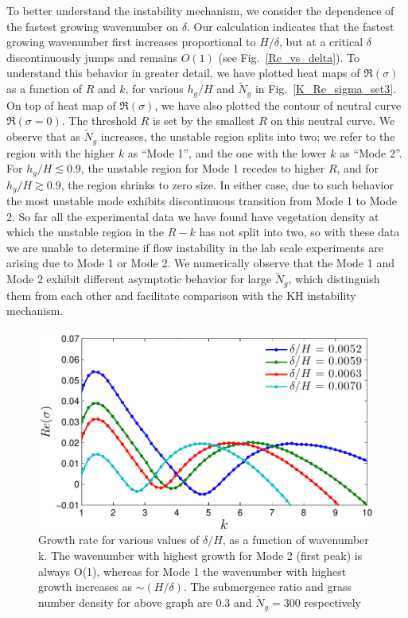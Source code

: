 \documentclass[12pt]{report}   %
\newcommand{\hg}{h_g}
\newcommand{\Rey}{{R}}
\newcommand{\Ndg}{\tilde{N}_g}
\begin{document}
To better understand the instability mechanism, we consider the dependence of the fastest growing wavenumber on $\delta$. Our calculation indicates that
the fastest growing wavenumber first increases proportional to $H/\delta$, but at a critical $\delta$ discontinuously jumps and remains $O(1)$ (see Fig.~\ref{Re_vs_delta}). 
To understand this behavior in greater detail, we have plotted heat maps of $\Re(\sigma)$ as a function of $\Rey$ and $k$, for various $\hg/H$ and $\Ndg$ in Fig.~\ref{K_Re_sigma_set3}. On top of heat map of $\Re(\sigma)$, we have also plotted the contour of neutral curve $\Re(\sigma=0)$. The threshold $\Rey$ is set by the smallest $\Rey$ on this neutral curve. 
We observe that as $\Ndg$ increases, the unstable region splits into two; we refer to the region with the higher $k$ as ``Mode 1'', and the one with the lower $k$ as ``Mode 2''. 
For $\hg/H\lesssim 0.9$, the unstable region for Mode 1 recedes to higher $\Rey$, and for $\hg/H \gtrsim 0.9$, the region shrinks to zero size.
In either case, due to such behavior the most unstable mode exhibits discontinuous transition from Mode 1 to Mode 2.
So far all the experimental data we have found have vegetation density at which the unstable region in the $\Rey-k$ has not split into two, so with these data we are unable to determine if flow instability in the lab scale experiments \citep{Nepf04} are arising due to Mode 1 or Mode 2. We numerically observe that the Mode 1 and Mode 2 exhibit different asymptotic behavior for large $\Ndg$, which distinguish them from each other and facilitate comparison with the KH instability mechanism.
\begin{figure}
 \includegraphics{K_vs_GrowthSet3}
 \caption{Growth rate for various values of $\delta/H$, as a function of wavenumber k. The wavenumber with highest growth for Mode 2 (first peak) is always O(1), whereas for Mode 1 the wavenumber with highest growth increases as $\sim (H/\delta)$. The submergence ratio and grass number density for above graph are $0.3$ and $\Ndg = 300$ respectively  }
 \label{K_vs_SigmaSet3}
\end{figure}
\end{document}
